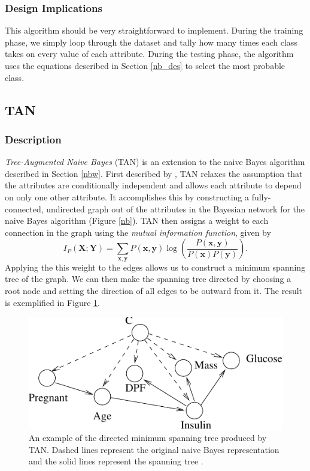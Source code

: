 \documentclass{article}
\newcommand{\ve}[1]{\boldsymbol{\mathbf{#1}}}
\begin{document}
			\subsubsection{Design Implications}
				This algorithm should be very straightforward to implement. 
				During the training phase, we simply loop through the dataset and tally how many times each class takes on every value of each attribute. 
				During the testing phase, the algorithm uses the equations described in Section \ref{nb_des} to select the most probable class.
		\subsection{TAN}
			\subsubsection{Description}
				\textit{Tree-Augmented Naive Bayes} (TAN) is an extension to the naive Bayes algorithm described in Section \ref{nbw}. 
				First described by \cite{Friedman1997}, TAN relaxes the assumption that the attributes are conditionally independent and allows each attribute to depend on only one other attribute. 
				It accomplishes this by constructing a fully-connected, undirected graph out of the attributes in the Bayesian network for the naive Bayes algorithm (Figure \ref{nb}). 
				TAN then assigns a weight to each connection in the graph using the \textit{mutual information function}, given by
				\begin{equation*}
					I_P(\ve{X};\ve{Y}) = \sum_{\ve{x},\ve{y}} P(\ve{x},\ve{y}) \log \left( \frac{P(\ve{x},\ve{y})}{P(\ve{x})P(\ve{y})} \right).
				\end{equation*}
				Applying the this weight to the edges allows us to construct a minimum spanning tree of the graph. 
				We can then make the spanning tree directed by choosing a root node and setting the direction of all edges to be outward from it. 
				The result is exemplified in Figure \ref{tan}.
				\begin{figure}[h]
					\centering
					\includegraphics{fig/tan}
					\caption{An example of the directed minimum spanning tree produced by TAN. Dashed lines represent the original naive Bayes representation and the solid lines represent the spanning tree \cite{Friedman1997}.}
					\label{tan}
				\end{figure}
\end{document}
